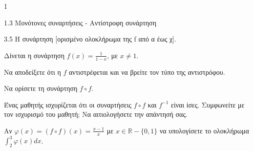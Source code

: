 \begin{ylh}{1}
    \item 1.3 Μονότονες συναρτήσεις - Αντίστροφη συνάρτηση
    \item 3.5 Η συνάρτηση [ορισμένο ολοκλήρωμα της f από α έως χ].
\end{ylh}
Δίνεται η συνάρτηση $f(x)=\frac{1}{1-x}$, με $x \neq 1$.
\begin{alist}
\item Να αποδείξετε ότι η $f$ αντιστρέφεται και να βρείτε τον τύπο της αντιστρόφου. 
\item Να ορίσετε τη συνάρτηση $f \circ f$. 
\item Ένας μαθητής ισχυρίζεται ότι οι συναρτήσεις $f \circ f$ και $f^{-1}$ είναι ίσες. Συμφωνείτε με τον ισχυρισμό του μαθητή; Να αιτιολογήσετε την απάντησή σας. 
\item Αν $\varphi(x) = (f \circ f)(x) = \frac{x-1}{x}$ με $x \in \mathbb{R}-\{0,1\}$ να υπολογίσετε το ολοκλήρωμα $\int_{2}^{3} \varphi(x)dx$. 
\end{alist}